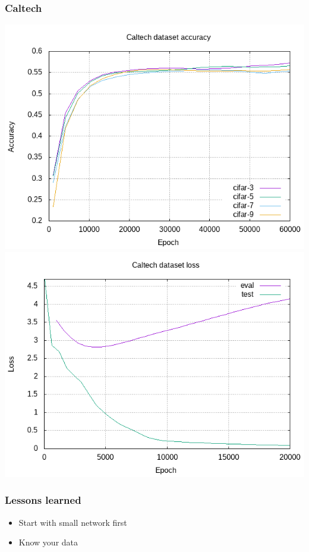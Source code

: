 \documentclass{beamer}
\begin{document}
\begin{frame}
\frametitle{Caltech}
\begin{center}
	\includegraphics[height=0.45\textheight]{caltech-accuracy}
	\includegraphics[height=0.45\textheight]{caltech-loss}
\end{center}
\end{frame}

\begin{frame}
\frametitle{Lessons learned}
\begin{itemize}
	\item Start with small network first
	\pause
	\item Know your data
\end{itemize}
\end{frame}
\end{document}
